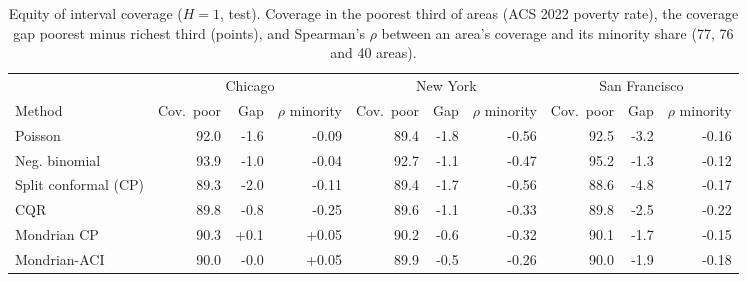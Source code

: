 \begin{table}[!htbp]\centering\scriptsize\setlength{\tabcolsep}{3.5pt}
\caption{Equity of interval coverage ($H=1$, test). Coverage in the poorest third of areas (ACS 2022 poverty rate), the coverage gap poorest minus richest third (points), and Spearman's $\rho$ between an area's coverage and its minority share (77, 76 and 40 areas).}\label{tab:equity}
\begin{adjustbox}{max width=\linewidth}\begin{tabular}{lrrrrrrrrr}\toprule
 & \multicolumn{3}{c}{Chicago} & \multicolumn{3}{c}{New York} & \multicolumn{3}{c}{San Francisco}\\\cmidrule(lr){2-4}\cmidrule(lr){5-7}\cmidrule(lr){8-10}
Method & Cov.\ poor & Gap & $\rho$ minority & Cov.\ poor & Gap & $\rho$ minority & Cov.\ poor & Gap & $\rho$ minority\\\midrule
Poisson & 92.0 & -1.6 & -0.09 & 89.4 & -1.8 & -0.56 & 92.5 & -3.2 & -0.16 \\
Neg. binomial & 93.9 & -1.0 & -0.04 & 92.7 & -1.1 & -0.47 & 95.2 & -1.3 & -0.12 \\
Split conformal (CP) & 89.3 & -2.0 & -0.11 & 89.4 & -1.7 & -0.56 & 88.6 & -4.8 & -0.17 \\
CQR & 89.8 & -0.8 & -0.25 & 89.6 & -1.1 & -0.33 & 89.8 & -2.5 & -0.22 \\
Mondrian CP & 90.3 & +0.1 & +0.05 & 90.2 & -0.6 & -0.32 & 90.1 & -1.7 & -0.15 \\
Mondrian-ACI & 90.0 & -0.0 & +0.05 & 89.9 & -0.5 & -0.26 & 90.0 & -1.9 & -0.18 \\
\bottomrule\end{tabular}\end{adjustbox}\end{table}
